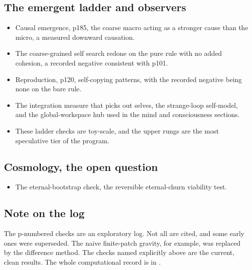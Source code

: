\subsection{The emergent ladder and observers}

\begin{itemize}
  \item Causal emergence, p185, the coarse macro acting as a stronger cause than the micro, a measured
  downward causation.
  \item The coarse-grained self search redone on the pure rule with no added cohesion, a recorded negative
  consistent with p101.
  \item Reproduction, p120, self-copying patterns, with the recorded negative being none on the bare rule.
  \item The integration measure that picks out selves, the strange-loop self-model, and the global-workspace
  hub used in the mind and consciousness sections.
  \item These ladder checks are toy-scale, and the upper rungs are the most speculative tier of the program.
\end{itemize}

\subsection{Cosmology, the open question}

\begin{itemize}
  \item The eternal-bootstrap check, the reversible eternal-churn viability test.
\end{itemize}

\subsection{Note on the log}

The p-numbered checks are an exploratory log. Not all are cited, and some early ones were superseded. The naive
finite-patch gravity, for example, was replaced by the difference method. The checks named explicitly above are the
current, clean results. The whole computational record is in \cite{pollard2026vibetest}.

